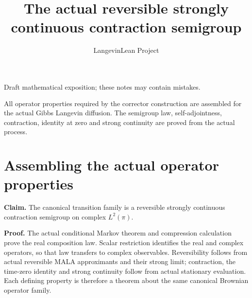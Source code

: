 \documentclass[11pt,a4paper]{article}
\title{\texorpdfstring{The actual reversible strongly continuous contraction semigroup}{The actual reversible strongly continuous contraction semigroup}}
\author{LangevinLean Project}
\date{}
\begin{document}
\maketitle
Draft mathematical exposition; these notes may contain mistakes.


All operator properties required by the corrector construction are assembled for the actual Gibbs Langevin diffusion. The semigroup law, self-adjointness, contraction, identity at zero and strong continuity are proved from the actual process.


\section{\texorpdfstring{Assembling the actual operator properties}{Assembling the actual operator properties}}


\textbf{Claim.} The canonical transition family is a reversible strongly continuous contraction semigroup on complex \(L^2(\pi)\).



\textbf{Proof.} The actual conditional Markov theorem and compression calculation prove the real composition law. Scalar restriction identifies the real and complex operators, so that law transfers to complex observables. Reversibility follows from actual reversible MALA approximants and their strong limit; contraction, the time-zero identity and strong continuity follow from actual stationary evaluation. Each defining property is therefore a theorem about the same canonical Brownian operator family.
\end{document}
